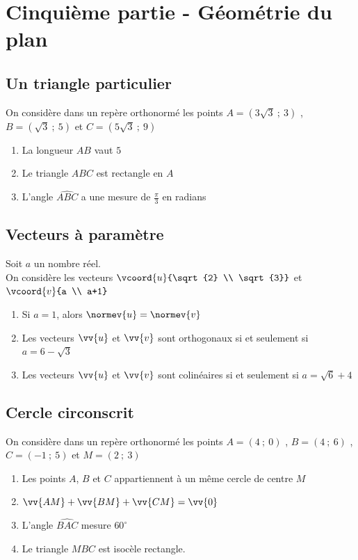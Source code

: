 \documentclass[oneside,12pt]{article}
\begin{document}
\section*{Cinquième partie - Géométrie du plan}

\subsection{Un triangle particulier}
On considère dans un repère orthonormé les points $A=(3\sqrt{3}~;~3)$ , $B=(\sqrt{3}~;~5)$ et $C=(5\sqrt{3}~;~9)$
\begin{enumerate}
	\item La longueur $AB$ vaut $5$
	\item Le triangle $ABC$ est rectangle en $A$
	\item L'angle $\widehat{ABC}$ a une mesure de $\frac{\pi}{3}$ en radians
\end{enumerate}



\subsection{Vecteurs à paramètre}
Soit $a$ un nombre réel.\\
On considère les vecteurs $\vcoord{u}{\sqrt{2} \\ \sqrt{3}}$ et $\vcoord{v}{a \\ a+1}$
\begin{enumerate}
	\item Si $a=1$, alors $\normev{u}=\normev{v}$
	\item Les vecteurs $\vv{u}$ et $\vv{v}$ sont orthogonaux si et seulement si $a=6-\sqrt{3}$
	\item Les vecteurs $\vv{u}$ et $\vv{v}$ sont colinéaires si et seulement si $a=\sqrt{6}+4$ 
\end{enumerate}



\subsection{Cercle circonscrit}
On considère dans un repère orthonormé les points $A=(4~;~0)$ , $B=(4~;~6)$ , $C=(-1~;~5)$ et $M=(2~;~3)$
\begin{enumerate}
	\item Les points $A$, $B$ et $C$ appartiennent à un même cercle de centre $M$
	\item $\vv{AM}+\vv{BM}+\vv{CM}=\vv{0}$
	\item L'angle $\widehat{BAC}$ mesure $60^\circ$
	\item Le triangle $MBC$ est isocèle rectangle.
\end{enumerate}
\end{document}
